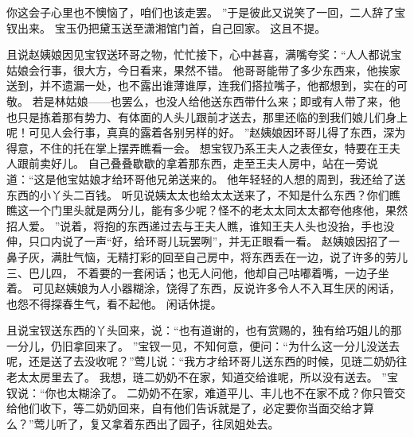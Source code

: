 你这会子心里也不懊恼了，咱们也该走罢。
”于是彼此又说笑了一回，二人辞了宝钗出来。
宝玉仍把黛玉送至潇湘馆门首，自己回家。
这且不提。
\par
且说赵姨娘因见宝钗送环哥之物，忙忙接下，心中甚喜，满嘴夸奖：“人人都说宝姑娘会行事，很大方，今日看来，果然不错。
他哥哥能带了多少东西来，他挨家送到，并不遗漏一处，也不露出谁薄谁厚，连我们搭拉嘴子，他都想到，实在的可敬。
若是林姑娘——也罢么，也没人给他送东西带什么来；即或有人带了来，他也只是拣着那有势力、有体面的人头儿跟前才送去，那里还临的到我们娘儿们身上呢！可见人会行事，真真的露着各别另样的好。
”赵姨娘因环哥儿得了东西，深为得意，不住的托在掌上摆弄瞧看一会。
想宝钗乃系王夫人之表侄女，特要在王夫人跟前卖好儿。
自己叠叠歇歇的拿着那东西，走至王夫人房中，站在一旁说道：“这是他宝姑娘才给环哥他兄弟送来的。
他年轻轻的人想的周到，我还给了送东西的小丫头二百钱。
听见说姨太太也给太太送来了，不知是什么东西？你们瞧瞧这一个门里头就是两分儿，能有多少呢？怪不的老太太同太太都夸他疼他，果然招人爱。
”说着，将抱的东西递过去与王夫人瞧，谁知王夫人头也没抬，手也没伸，只口内说了一声“好，给环哥儿玩罢咧”，并无正眼看一看。
赵姨娘因招了一鼻子灰，满肚气恼，无精打彩的回至自己房中，将东西丢在一边，说了许多的劳儿三、巴儿四，
不着要的一套闲话；也无人问他，他却自己咕嘟着嘴，一边子坐着。
可见赵姨娘为人小器糊涂，饶得了东西，反说许多令人不入耳生厌的闲话，也怨不得探春生气，看不起他。
闲话休提。
\par
且说宝钗送东西的丫头回来，说：“也有道谢的，也有赏赐的，独有给巧姐儿的那一分儿，仍旧拿回来了。
”宝钗一见，不知何意，便问：“为什么这一分儿没送去呢，还是送了去没收呢？”莺儿说：“我方才给环哥儿送东西的时候，见琏二奶奶往老太太房里去了。
我想，琏二奶奶不在家，知道交给谁呢，所以没有送去。
”宝钗说：“你也太糊涂了。
二奶奶不在家，难道平儿、丰儿也不在家不成？你只管交给他们收下，等二奶奶回来，自有他们告诉就是了，必定要你当面交给才算么？”莺儿听了，复又拿着东西出了园子，往凤姐处去。
